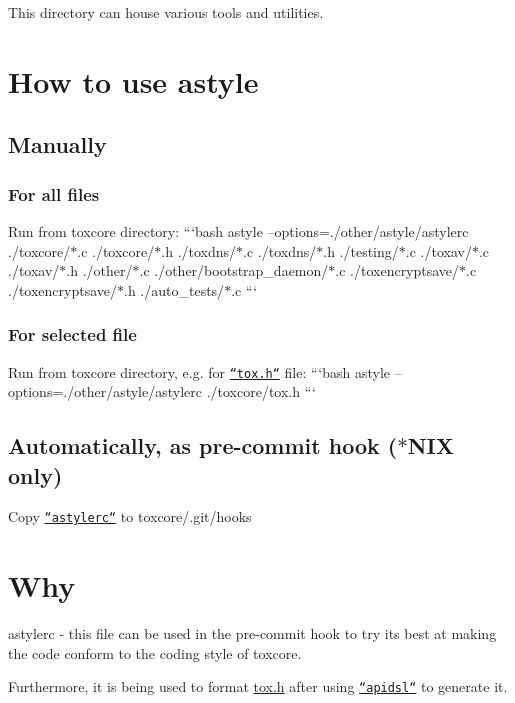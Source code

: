 This directory can house various tools and utilities.

\section*{How to use astyle}

\subsection*{Manually}

\subsubsection*{For all files}

Run from {\ttfamily toxcore} directory\+: ```bash astyle --options=./other/astyle/astylerc ./toxcore/$\ast$.c ./toxcore/$\ast$.h ./toxdns/$\ast$.c ./toxdns/$\ast$.h ./testing/$\ast$.c ./toxav/$\ast$.c ./toxav/$\ast$.h ./other/$\ast$.c ./other/bootstrap\+\_\+daemon/$\ast$.c ./toxencryptsave/$\ast$.c ./toxencryptsave/$\ast$.h ./auto\+\_\+tests/$\ast$.c ```

\subsubsection*{For selected file}

Run from {\ttfamily toxcore} directory, e.\+g. for \href{/toxcore/tox.h}{\tt ``tox.h``} file\+: ```bash astyle --options=./other/astyle/astylerc ./toxcore/tox.h ```

\subsection*{Automatically, as pre-\/commit hook ($\ast$\+N\+I\+X only)}

Copy \href{/other/astyle/astylerc}{\tt ``astylerc``} to {\ttfamily toxcore/.git/hooks}

\section*{Why}

{\ttfamily astylerc} -\/ this file can be used in the pre-\/commit hook to try its best at making the code conform to the coding style of toxcore.

Furthermore, it is being used to format {\ttfamily \hyperlink{tox_8h}{tox.\+h}} after using \href{/other/apidsl}{\tt ``apidsl``} to generate it. 